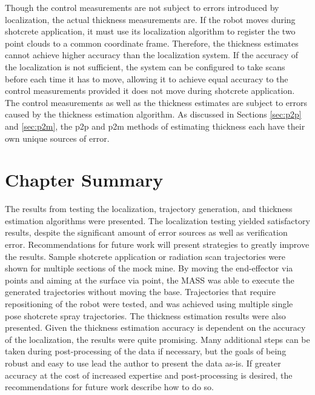 Though the control measurements are not subject to errors introduced by localization, the actual thickness measurements are. If the robot moves during shotcrete application, it must use its localization algorithm to register the two point clouds to a common coordinate frame. Therefore, the thickness estimates cannot achieve higher accuracy than the localization system. If the accuracy of the localization is not sufficient, the system can be configured to take scans before each time it has to move, allowing it to achieve equal accuracy to the control measurements provided it does not move during shotcrete application.\\

The control measurements as well as the thickness estimates are subject to errors caused by the thickness estimation algorithm. As discussed in Sections \ref{sec:p2p} and \ref{sec:p2m}, the \acrshort{p2p} and \acrshort{p2m} methods of estimating thickness each have their own unique sources of error.\\

\section{Chapter Summary}

The results from testing the localization, trajectory generation, and thickness estimation algorithms were presented. The localization testing yielded satisfactory results, despite the significant amount of error sources as well as verification error. Recommendations for future work will present strategies to greatly improve the results. Sample shotcrete application or radiation scan trajectories were shown for multiple sections of the mock mine. By moving the end-effector via points and aiming at the surface via point, the MASS was able to execute the generated trajectories without moving the base. Trajectories that require repositioning of the robot were tested, and was achieved using multiple single pose shotcrete spray trajectories. The thickness estimation results were also presented. Given the thickness estimation accuracy is dependent on the accuracy of the localization, the results were quite promising. Many additional steps can be taken during post-processing of the data if necessary, but the goals of being robust and easy to use lead the author to present the data as-is. If greater accuracy at the cost of increased expertise and post-processing is desired, the recommendations for future work describe how to do so.\\